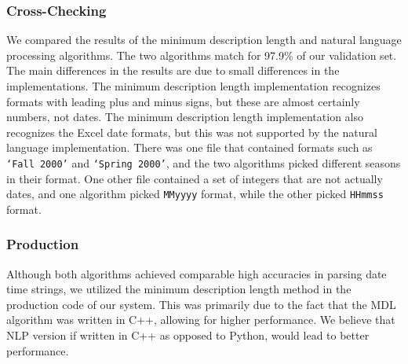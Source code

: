 \subsubsection{Cross-Checking}
We compared the results of the minimum description length and natural language processing algorithms. The two algorithms match for 97.9\% of our validation set. The main differences in the results are due to small differences in the implementations. The minimum description length implementation recognizes formats with leading plus and minus signs, but these are almost certainly numbers, not dates. The minimum description length implementation also recognizes the Excel date formats, but this was not supported by the natural language implementation. There was one file that contained formats such as \texttt{`Fall 2000'} and \texttt{`Spring 2000'}, and the two algorithms picked different seasons in their format. One other file contained a set of integers that are not actually dates, and one algorithm picked \texttt{MMyyyy} format, while the other picked \texttt{HHmmss} format.

\subsubsection{Production}

Although both algorithms achieved comparable high accuracies in parsing date time strings, we utilized the minimum description length method in the production code of our system. This was primarily due to the fact that the MDL algorithm was written in C++, allowing for higher performance. We believe that NLP version if written in C++ as opposed to Python, would lead to better performance. 